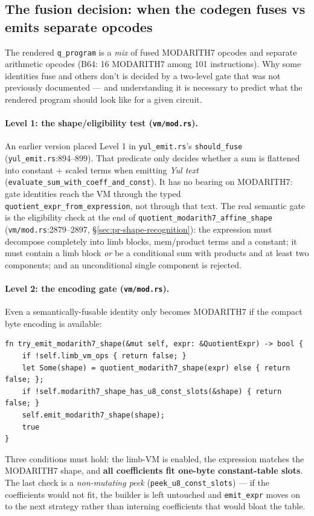 \subsection{The fusion decision: when the codegen fuses vs emits separate opcodes}
\label{sec:pr-fusion-decision}

The rendered \texttt{q\_program} is a \emph{mix} of fused
MODARITH7 opcodes and separate arithmetic opcodes (B64: 16
MODARITH7 among 101 instructions). Why some identities fuse and
others don't is decided by a two-level gate that was not
previously documented --- and understanding it is necessary to
predict what the rendered program should look like for a given
circuit.

\paragraph{Level 1: the shape/eligibility test (\texttt{vm/mod.rs}).}
 An earlier version placed Level 1 in
\texttt{yul\_emit.rs}'s \texttt{should\_fuse}
(\texttt{yul\_emit.rs}:894--899). That predicate only decides
whether a sum is flattened into constant + scaled terms when
emitting \emph{Yul text}
(\texttt{evaluate\_\allowbreak{}sum\_\allowbreak{}with\_\allowbreak{}coeff\_\allowbreak{}and\_\allowbreak{}const}). It has no
bearing on MODARITH7: gate identities reach the VM through the
typed \texttt{quotient\_\allowbreak{}expr\_\allowbreak{}from\_\allowbreak{}expression}, not through that
text. The real semantic gate is the eligibility check at the end of
\texttt{quotient\_\allowbreak{}modarith7\_\allowbreak{}affine\_\allowbreak{}shape}
(\texttt{vm/mod.rs}:2879--2897, §\ref{sec:pr-shape-recognition}):
the expression must decompose completely into limb blocks,
mem/product terms and a constant; it must contain a limb block
\emph{or} be a conditional sum with products and at least two
components; and an unconditional single component is rejected.

\paragraph{Level 2: the encoding gate (\texttt{vm/mod.rs}).}
Even a semantically-fusable identity only becomes MODARITH7 if
the compact byte encoding is available:
\begin{lstlisting}[style=rust]
fn try_emit_modarith7_shape(&mut self, expr: &QuotientExpr) -> bool {
    if !self.limb_vm_ops { return false; }
    let Some(shape) = quotient_modarith7_shape(expr) else { return false; };
    if !self.modarith7_shape_has_u8_const_slots(&shape) { return false; }
    self.emit_modarith7_shape(shape);
    true
}
\end{lstlisting}
Three conditions must hold: the limb-VM is enabled, the expression
matches the MODARITH7 shape, and \textbf{all coefficients fit
one-byte constant-table slots}. The last check is a
\emph{non-mutating peek} (\texttt{peek\_\allowbreak{}u8\_\allowbreak{}const\_\allowbreak{}slots}) ---
if the coefficients would not fit, the builder is left untouched
and \texttt{emit\_expr} moves on to the next strategy rather than
interning coefficients that would bloat the table.

